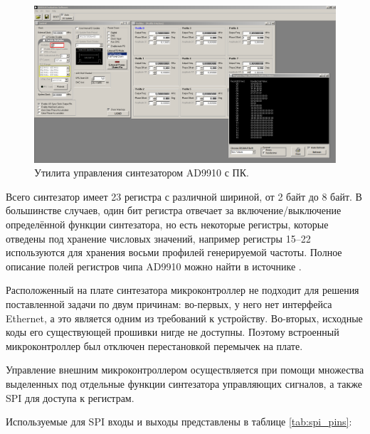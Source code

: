 \documentclass[rusmathsym, eqnumwithinsec, amspack, hyperref]{bomgost}
\begin{document}
\begin{gostfigure}
\begin{figure}[H]
\centering
\includegraphics[scale=.25]{data/ad9910_evaluation_software.png}
\caption{Утилита управления синтезатором AD9910 с ПК.}
\label{fig:ad9910_evaluation_software}
\end{figure}
\end{gostfigure}

Всего синтезатор имеет 23 регистра с различной шириной, от 2 байт до 8 байт. В большинстве случаев, один бит регистра отвечает за включение/выключение определённой функции синтезатора, но есть некоторые регистры, которые отведены под хранение числовых значений, например регистры 15--22 используются для хранения восьми профилей генерируемой частоты. Полное описание полей регистров чипа AD9910 можно найти в источнике \cite{AD9910Datasheet}.

Расположенный на плате синтезатора микроконтроллер не подходит для решения поставленной задачи по двум причинам: во-первых, у него нет интерфейса Ethernet, а это является одним из требований к устройству. Во-вторых, исходные коды его существующей прошивки нигде не доступны. Поэтому встроенный микроконтроллер был отключен перестановкой перемычек на плате.

Управление внешним микроконтроллером осуществляется при помощи множества выделенных под отдельные функции синтезатора управляющих сигналов, а также SPI для доступа к регистрам.

Используемые для SPI входы и выходы представлены в таблице \ref{tab:spi_pins}:
\end{document}

